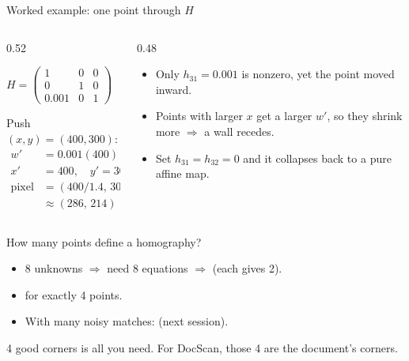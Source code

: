 \documentclass[10pt,aspectratio=169]{beamer}
\begin{document}
\begin{frame}{Worked example: one point through $H$}
  \begin{columns}[T]
    \begin{column}{0.52\textwidth}
      \begin{mathbox}
        $H=\begin{pmatrix}1&0&0\\0&1&0\\0.001&0&1\end{pmatrix}$
      \end{mathbox}
      Push $(x,y)=(400,300)$:
      \begin{align*}
        w' &= 0.001(400)+1 = 1.4\\
        x' &= 400,\quad y'=300\\
        \text{pixel} &= (400/1.4,\,300/1.4)\\
                     &\approx (286,\,214)
      \end{align*}
    \end{column}
    \begin{column}{0.48\textwidth}
      \begin{itemize}
        \item Only $h_{31}=0.001$ is nonzero, yet the point moved inward.
        \item Points with larger $x$ get a larger $w'$, so they shrink more $\Rightarrow$ a wall recedes.
        \item Set $h_{31}=h_{32}=0$ and it collapses back to a pure affine map.
      \end{itemize}
    \end{column}
  \end{columns}
\end{frame}

\begin{frame}{How many points define a homography?}
  \begin{itemize}
    \item 8 unknowns $\Rightarrow$ need 8 equations $\Rightarrow$  (each gives 2).
    \item {} for exactly 4 points.
    \item With many noisy matches:  (next session).
  \end{itemize}
  \begin{goodbox}
    4 good corners is all you need. For DocScan, those 4 are the document's corners.
  \end{goodbox}
\end{frame}
\end{document}
